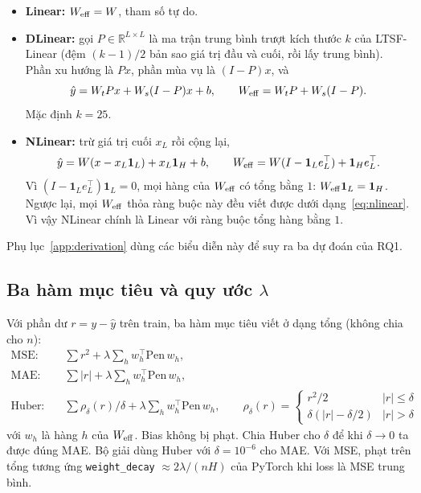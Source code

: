 \begin{itemize}
    \item \textbf{Linear:} $W_{\mathrm{eff}} = W$, tham số tự do.
    \item \textbf{DLinear:} gọi $P \in \mathbb{R}^{L \times L}$ là ma trận trung bình trượt kích thước $k$ của LTSF-Linear (đệm $(k-1)/2$ bản sao giá trị đầu và cuối, rồi lấy trung bình). Phần xu hướng là $Px$, phần mùa vụ là $(I - P)x$, và
    \begin{equation}
        \hat y = W_t P x + W_s (I - P) x + b, \qquad W_{\mathrm{eff}} = W_t P + W_s (I - P).
        \label{eq:dlinear}
    \end{equation}
    Mặc định $k = 25$.
    \item \textbf{NLinear:} trừ giá trị cuối $x_L$ rồi cộng lại,
    \begin{equation}
        \hat y = W (x - x_L \mathbf{1}_L) + x_L \mathbf{1}_H + b, \qquad W_{\mathrm{eff}} = W (I - \mathbf{1}_L e_L^\top) + \mathbf{1}_H e_L^\top .
        \label{eq:nlinear}
    \end{equation}
    Vì $(I - \mathbf{1}_L e_L^\top)\mathbf{1}_L = 0$, mọi hàng của $W_{\mathrm{eff}}$ có tổng bằng $1$: $W_{\mathrm{eff}} \mathbf{1}_L = \mathbf{1}_H$. Ngược lại, mọi $W_{\mathrm{eff}}$ thỏa ràng buộc này đều viết được dưới dạng~\eqref{eq:nlinear}. Vì vậy NLinear chính là Linear với ràng buộc tổng hàng bằng $1$.
\end{itemize}

Phụ lục~\ref{app:derivation} dùng các biểu diễn này để suy ra ba dự đoán của RQ1.

\subsection{Ba hàm mục tiêu và quy ước \texorpdfstring{$\lambda$}{lambda}}
\label{sec:method-objectives}

Với phần dư $r = y - \hat y$ trên train, ba hàm mục tiêu viết ở dạng tổng (không chia cho $n$):
\begin{align}
    \text{MSE:}\quad & \textstyle\sum r^2 + \lambda \sum_h w_h^\top \mathrm{Pen}\, w_h, \\
    \text{MAE:}\quad & \textstyle\sum |r| + \lambda \sum_h w_h^\top \mathrm{Pen}\, w_h, \\
    \text{Huber:}\quad & \textstyle\sum \rho_\delta(r)/\delta + \lambda \sum_h w_h^\top \mathrm{Pen}\, w_h, \qquad
    \rho_\delta(r) = \begin{cases} r^2/2 & |r| \le \delta \\ \delta(|r| - \delta/2) & |r| > \delta \end{cases}
\end{align}
với $w_h$ là hàng $h$ của $W_{\mathrm{eff}}$. Bias không bị phạt. Chia Huber cho $\delta$ để khi $\delta \to 0$ ta được đúng MAE. Bộ giải dùng Huber với $\delta = 10^{-6}$ cho MAE. Với MSE, phạt trên tổng tương ứng \texttt{weight\_decay} $\approx 2\lambda/(nH)$ của PyTorch khi loss là MSE trung bình.

